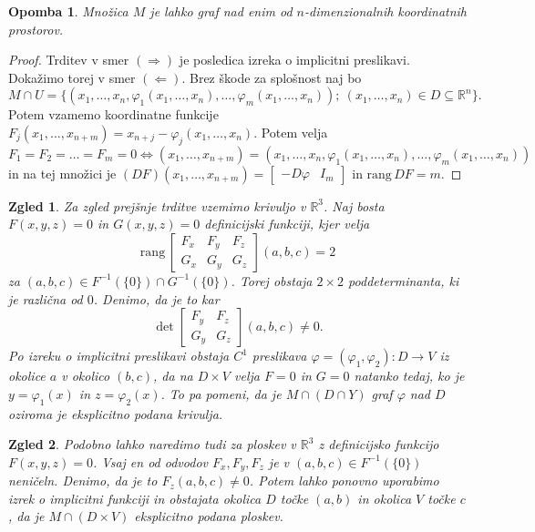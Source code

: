 \documentclass[10pt, a4paper]{article}
\newtheorem*{opomba}{Opomba}
\newtheorem{zgled}{Zgled}[section]
\newenvironment{noticeC}{%
  \tcolorbox[%
  notitle,
  empty,
  enhanced,  %
  breakable,
  coltext=black, 
  fontupper=\rmfamily,
  parbox=false,
  noparskip,
  sharp corners,
  boxrule=-1pt,  %
  frame hidden,
  left=7pt,  %
  right=7pt,
  top=5pt,
  bottom=5pt,
  before skip=2.5ex plus 2pt,
  after skip=2.5ex plus 2pt,
  overlay unbroken and last={%
  },
  ]}
{\endtcolorbox}
\newenvironment{dokaz}%
  {\begin{noticeC}\begin{proof}}%
  {\end{proof}\end{noticeC}}
\newcommand{\R}{\mathbb {R}}
\newcommand{\rang}{\mathrm{\text{rang}}\,}
\begin{document}
\begin{opomba}
Množica $M$ je lahko graf nad enim od $n$-dimenzionalnih koordinatnih prostorov.
\end{opomba}

\begin{dokaz}
    Trditev v smer $(\Rightarrow)$ je posledica izreka o implicitni preslikavi.
    Dokažimo torej v smer $(\Leftarrow)$. Brez škode za splošnost naj bo 
    $$M \cap U = \{(x_1, \dots, x_n, \varphi_1(x_1, \dots, x_n), \dots, \varphi_m(x_1, \dots, x_n));\ (x_1, \dots, x_n) \in D \subseteq \R^n \}.$$
    Potem vzamemo koordinatne funkcije $F_j (x_1, \dots, x_{n + m})= x_{n + j} - \varphi_j(x_1, \dots, x_n)$.
    Potem velja 
    $$F_1 = F_2 = \dots = F_m = 0 \Leftrightarrow (x_1, \dots, x_{n + m}) = (x_1, \dots, x_n, \varphi_1 (x_1, \dots, x_n), \dots, \varphi_m (x_1, \dots, x_n))$$
    in na tej množici je $(DF) (x_1, \dots, x_{n + m})= \begin{bmatrix}
        -D \varphi & I_m
    \end{bmatrix}$ in $\rang DF = m$.
\end{dokaz}

\begin{zgled}
  Za zgled prejšnje trditve vzemimo krivuljo v $\R^3$. Naj bosta 
  $F(x, y, z) = 0$ in $G(x, y, z) = 0$ definicijski funkciji, kjer velja
  $$\rang \begin{bmatrix}
    F_x & F_y & F_z\\
    G_x & G_y & G_z
  \end{bmatrix} (a, b, c) = 2$$ 
  za $(a, b, c) \in F^{-1} (\{0\}) \cap G^{-1} (\{0\})$.
  Torej obstaja $2 \times 2$ poddeterminanta, ki je različna od $0$.
  Denimo, da je to kar
  $$\det \begin{bmatrix}
    F_y & F_z\\
    G_y & G_z
  \end{bmatrix} (a, b, c) \neq 0.$$
  Po izreku o implicitni preslikavi obstaja $C^1$ preslikava 
  $\varphi = (\varphi_1, \varphi_2): D \to V$ iz okolice
  $a$ v okolico $(b, c)$, da na $D \times V$ velja $F = 0$ in $G = 0$
  natanko tedaj, ko je $y = \varphi_1 (x)$ in $z = \varphi_2 (x)$.
  To pa pomeni, da je $M \cap (D \cap Y)$ graf $\varphi$ nad $D$
  oziroma je eksplicitno podana krivulja.
\end{zgled}

\begin{zgled}
  Podobno lahko naredimo tudi za ploskev v $\R^3$
  z definicijsko funkcijo $F(x, y, z) = 0$.
  Vsaj en od odvodov $F_x, F_y, F_z$ je v $(a, b, c) \in F^{-1} (\{0\})$
  neničeln. Denimo, da je to $F_z (a, b, c) \neq 0$.
  Potem lahko ponovno uporabimo izrek o implicitni funkciji 
  in obstajata okolica $D$ točke $(a, b)$ in okolica $V$ točke $c$,
  da je $M \cap (D \times V)$ eksplicitno podana ploskev.
\end{zgled}
\end{document}
